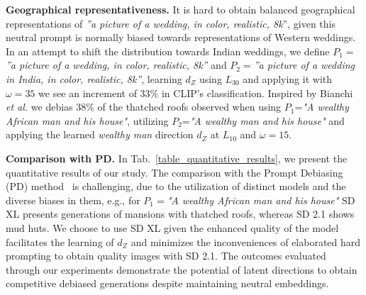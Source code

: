 \noindent\textbf{Geographical representativeness.} It is hard to obtain balanced geographical representations of \textit{”a picture of a wedding, in color, realistic, 8k}”, given this neutral prompt is normally biased towards representations of Western weddings. In an attempt to shift the distribution towards Indian weddings, we define $P_{1}=$\textit{”a picture of a wedding, in color, realistic, 8k”} and $P_{2}=$\textit{”a picture of a wedding in India, in color, realistic, 8k”}, learning $d_{Z}$ using $L_{30}$ and applying it with $\omega=35$ we see an increment of 33\% in CLIP's classification. Inspired by Bianchi \textit{et al.} \cite{sunandopaper} we debias 38\% of the thatched roofs observed when using $P_{1}$=\textit{"A wealthy African man and his house"}, utilizing $P_{2}$=\textit{"A wealthy man and his house"} and applying the learned \textit{wealthy man} direction $d_{Z}$ at $L_{10}$ and $\omega=15$.

\noindent\textbf{Comparison with PD.} In Tab.~\ref{table_quantitative_results}, we present the quantitative results of our study. The comparison with the Prompt Debiasing (PD) method~\cite{chuang2023debiasing} is challenging, due to the utilization of distinct models and the diverse biases in them, e.g., for $P_{1}=$\textit{"A wealthy African man and his house"} SD XL presents generations of mansions with thatched roofs, whereas SD 2.1 shows mud huts. We choose to use SD XL given the enhanced quality of the model facilitates the learning of $d_{Z}$ and minimizes the inconveniences of elaborated hard prompting to obtain quality images with SD 2.1. The outcomes evaluated through our experiments demonstrate the potential of latent directions to obtain competitive debiased generations despite maintaining neutral embeddings. 

